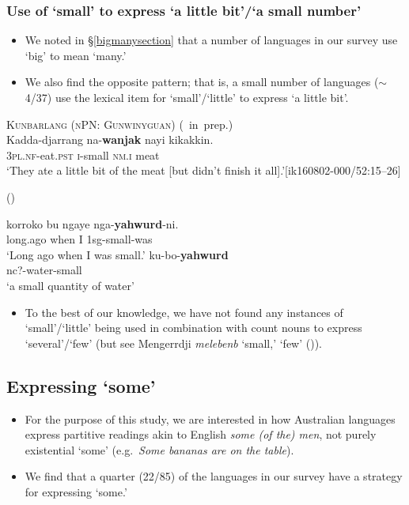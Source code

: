 \documentclass{article}
\makeatletter
\newcommand{\ofy}{/85} %
\makeatother
\begin{document}
\subsubsection{Use of `small' to express `a little bit'/`a small number'}

\begin{itemize}
\item We noted in \S\ref{bigmanysection} that a number of languages in our survey use `big' to mean `many.'
\item We also find the opposite pattern; that is, a small number of languages ($\sim$4/37) use the lexical item for `small'/`little' to express `a little bit'. %
\end{itemize}
\begin{exe}
\ex\label{ex:lil} \textsc{Kunbarlang (nPN: Gunwinyguan)} (\citealt{ikthesis}~in~prep.)\\
\gll Kadda-djarrang na-\textbf{wanjak} nayi kikakkin.\\
\textsc{3pl.nf}-eat.\textsc{pst} \textsc{i}-small \textsc{nm.i} meat\\
\glt `They ate a little bit of the meat [but didn't finish it all].'\hfill [ik160802-000/52:15--26]

\newpage
{} (\citealt[76,116]{carroll76}) 
\begin{xlist}
\ex 
\gll korroko     bu    ngaye        nga-\textbf{yahwurd}-ni. \\
    long.ago    when    I        1{\sc sg}-small-was \\
\glt    `Long ago when I was small.'
\ex \gll ku-bo-\textbf{yahwurd} \\
    {\sc nc?}-water-small\\
\glt `a small quantity of water' 
    \end{xlist}
    \end{exe}

\begin{itemize}
    \item To the best of our knowledge, we have not found any instances of `small'/`little' being used in combination with count nouns to express `several'/`few' (but see Mengerrdji \textit{melebenb} `small,' `few' (\citealt[70]{birch06})).
\end{itemize}    


\subsection{Expressing `some'}
\begin{itemize}
\item For the purpose of this study, we are interested in how Australian languages express partitive readings akin to English {\it some (of the) men}, not purely existential `some' (e.g.\ {\it Some bananas are on the table}).
\item We find that a quarter (22\ofy) of the languages in our survey have a strategy for expressing `some.'
\end{itemize}
\end{document}
